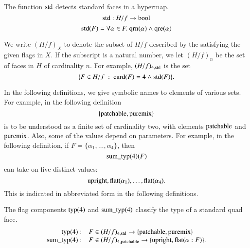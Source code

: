 \begin{definition} The function ${\operatorname{std}}$ detects standard faces
in a hypermap.
    $${\operatorname{std}}:H/f \to \operatorname{bool}$$
$${\operatorname{std}}(F) = \forall\alpha\in F.\
{\operatorname{qrn}}(\alpha)\wedge {\operatorname{qre}}(\alpha)
$$
\end{definition}

\begin{notation}
We write $(H/f)_X$ to denote the subset of $H/f$ described by the
satisfying the given flags in $X$.  If the subscript is a natural
number, we let $(H/f)_n$ be the set of faces in $H$ of cardinality
$n$.  For example, $(H/f)_{4,{\operatorname{std}}}$ is the set
    $$
    \{F \in H/f \ :\  {\operatorname{card}}(F) = 4 \wedge {\operatorname{std}}(F)\}.
    $$
\end{notation}



In the following definitions, we give symbolic names to elements
of various sets.  For example, in the following definition
    $$\{{\operatorname{patchable}},{\operatorname{puremix}}\}$$
is to be understood as a finite set of cardinality two, with
elements ${\operatorname{patchable}}$ and ${\operatorname{puremix}}$.  Also, some of the
values depend on parameters.  For example, in the following
definition, if $F=\{\alpha_1,\ldots,\alpha_4\}$, then
    $$
    {\operatorname{sum\_typ}}(4)(F)
    $$
can take on five distinct values:
    $$
    {\operatorname{upright}}, {\operatorname{flat}}(\alpha_1), \ldots,
    {\operatorname{flat}}(\alpha_4).
    $$
This is indicated in abbreviated form in the following
definitions.

\begin{definition}
The flag components ${\operatorname{typ}}(4)$ and ${\operatorname{sum\_typ}}(4)$
classify the type of a standard quad face.
    $$
    \begin{array}{rll}
    {\operatorname{typ}}(4):& F\in (H/f)_{4,{\operatorname{std}}}
    \to
    \{{\operatorname{patchable}},{\operatorname{puremix}}\}\\
    {\operatorname{sum\_typ}}(4):& F\in (H/f)_{4,{\operatorname{patchable}}}
    \to
    \{{\operatorname{upright}},{\operatorname{flat}}(\alpha:F)\}.
    \end{array}
    $$
\end{definition}


